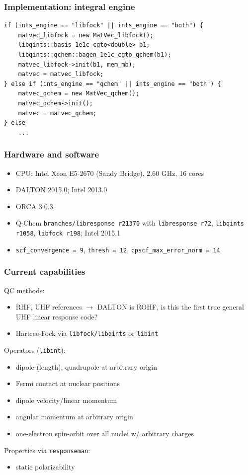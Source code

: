 \documentclass{beamer}
\begin{document}
\begin{frame}[fragile]
  \frametitle{Implementation: integral engine}
  \scriptsize
  \begin{verbatim}
if (ints_engine == "libfock" || ints_engine == "both") {
    matvec_libfock = new MatVec_libfock();
    libqints::basis_1e1c_cgto<double> b1;
    libqints::qchem::bagen_1e1c_cgto_qchem(b1);
    matvec_libfock->init(b1, mem_mb);
    matvec = matvec_libfock;
} else if (ints_engine == "qchem" || ints_engine == "both") {
    matvec_qchem = new MatVec_qchem();
    matvec_qchem->init();
    matvec = matvec_qchem;
} else
    ...
  \end{verbatim}
\end{frame}

\begin{frame}
  \frametitle{Hardware and software}
  \begin{itemize}
  \item CPU: Intel Xeon E5-2670 (Sandy Bridge), 2.60 GHz, 16 cores
  \item DALTON 2015.0; Intel 2013.0
  \item ORCA 3.0.3
  \item Q-Chem \texttt{branches/libresponse r21370} with \texttt{libresponse r72}, \texttt{libqints r1058}, \texttt{libfock r198}; Intel 2015.1
  \item \texttt{scf\_convergence = 9}, \texttt{thresh = 12}, \texttt{cpscf\_max\_error\_norm = 14}
  \end{itemize}
\end{frame}

\begin{frame}
  \frametitle{Current capabilities}
  QC methods:
  \begin{itemize}
  \item RHF, UHF references \(\rightarrow\) DALTON is ROHF, is this the first true general UHF linear response code?
  \item Hartree-Fock via \texttt{libfock/libqints} or \texttt{libint}
  \end{itemize}
  Operators (\texttt{libint}):
  \begin{itemize}
  \item dipole (length), quadrupole at arbitrary origin
  \item Fermi contact at nuclear positions
  \item dipole velocity/linear momentum
  \item angular momentum at arbitrary origin
  \item one-electron spin-orbit over all nuclei w/ arbitrary charges
  \end{itemize}
  Properties via \texttt{responseman}:
  \begin{itemize}
  \item static polarizability
  \end{itemize}
\end{frame}
\end{document}
